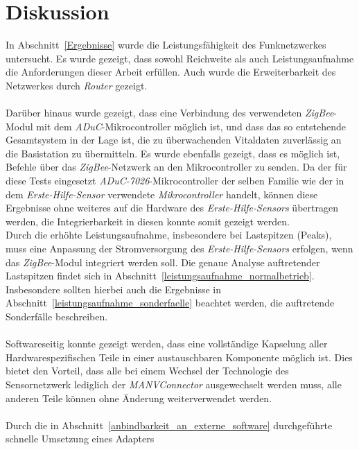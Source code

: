 
\chapter{Diskussion}\label{Diskussion}
In Abschnitt~\ref{Ergebnisse} wurde die Leistungsfähigkeit des Funknetzwerkes untersucht.
Es wurde gezeigt, dass sowohl Reichweite als auch Leistungsaufnahme die Anforderungen
dieser Arbeit erfüllen. Auch wurde die Erweiterbarkeit des Netzwerkes durch \emph{Router} gezeigt.\\
\\
Darüber hinaus wurde gezeigt, dass eine Verbindung des verwendeten \emph{ZigBee}-Modul
mit dem \emph{ADuC}-Mikrocontroller möglich ist, und dass das so entstehende Gesamtsystem
in der Lage ist, die zu überwachenden Vitaldaten zuverlässig an die Basistation zu übermitteln.
Es wurde ebenfalls gezeigt, dass es möglich ist, Befehle über das \emph{ZigBee}-Netzwerk
an den Mikrocontroller zu senden. Da der für diese Tests eingesetzt \emph{ADuC-7026}-Mikrocontroller
der selben Familie wie der in dem \emph{Erste-Hilfe-Sensor} verwendete \emph{Mikrocontroller} handelt,
können diese Ergebnisse ohne weiteres auf die Hardware des \emph{Erste-Hilfe-Sensors} übertragen werden, 
die Integrierbarkeit in diesen konnte somit gezeigt werden.\\
Durch die erhöhte Leistungsaufnahme, insbesondere bei Lastspitzen (Peaks), muss eine Anpassung
der Stromversorgung des \emph{Erste-Hilfe-Sensors} erfolgen, wenn das \emph{ZigBee}-Modul integriert
werden soll. Die genaue Analyse auftretender Lastspitzen findet sich in Abschnitt~\ref{leistungsaufnahme_normalbetrieb}.
Insbesondere sollten hierbei auch die Ergebnisse in Abschnitt~\ref{leistungsaufnahme_sonderfaelle} beachtet 
werden, die auftretende Sonderfälle beschreiben.\\
\\
Softwareseitig konnte gezeigt werden, dass eine vollständige Kapselung aller Hardwarespezifischen Teile
in einer austauschbaren Komponente möglich ist. Dies bietet den Vorteil, dass alle bei einem Wechsel 
der Technologie des Sensornetzwerk lediglich der \emph{MANVConnector} ausgewechselt werden muss,
alle anderen Teile können ohne Änderung weiterverwendet werden.\\
\\
Durch die in Abschnitt~\ref{anbindbarkeit_an_externe_software} durchgeführte schnelle Umsetzung eines Adapters 
